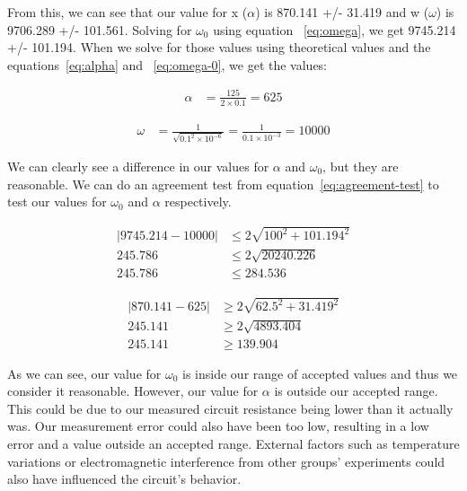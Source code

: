 \documentclass[11pt]{article}
\begin{document}
    From this, we can see that our value for x (\( \alpha \)) is 870.141 +/- 31.419 and w (\( \omega \)) is 9706.289 +/- 101.561. Solving for \( \omega_0 \) using equation ~\ref{eq:omega}, we get 9745.214 +/- 101.194. When we solve for those values using theoretical values and the equations~\ref{eq:alpha} and ~\ref{eq:omega-0}, we get the values:

    \begin{align*}
        \alpha &= \frac{125}{2 \times 0.1} = 625
    \end{align*}

    \begin{align*}
        \omega &= \frac{1}{\sqrt{0.1^2 \times 10^{-6}}} = \frac{1}{0.1 \times 10^{-3}} = 10000
    \end{align*}

    We can clearly see a difference in our values for \( \alpha \) and \( \omega_0 \), but they are reasonable. We can do an agreement test from equation~\ref{eq:agreement-test} to test our values for \( \omega_0 \) and \( \alpha \) respectively.

    \begin{e}
        \begin{align*}
            |9745.214 - 10000| &\le 2 \sqrt{100^2 + 101.194^2} \\
            245.786 &\le 2 \sqrt{20240.226} \\
            245.786 &\le 284.536
        \end{align*}
    \end{e}
    \begin{e}
        \begin{align*}
            |870.141 - 625| &\ge 2 \sqrt{62.5^2 + 31.419^2} \\
            245.141 &\ge 2 \sqrt{4893.404} \\
            245.141 &\ge 139.904
        \end{align*}
    \end{e}

    As we can see, our value for \( \omega_0 \) is inside our range of accepted values and thus we consider it reasonable. However, our value for \( \alpha \) is outside our accepted range. This could be due to our measured circuit resistance being lower than it actually was. Our measurement error could also have been too low, resulting in a low error and a value outside an accepted range. External factors such as temperature variations or electromagnetic interference from other groups' experiments could also have influenced the circuit's behavior.
\end{document}
